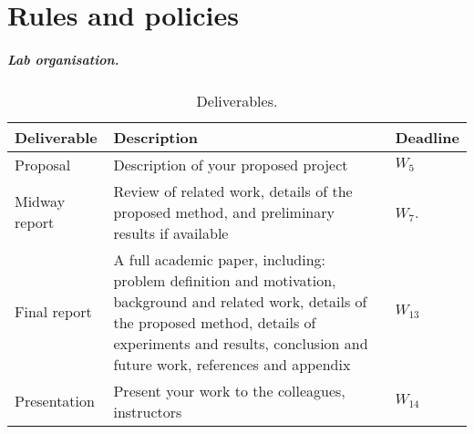 \chapter{Rules and policies}



\paragraph{Lab organisation.} 


\begin{table}
\caption{\label{tab:deliverables}Deliverables.}
\begin{center}
\begin{tabular}{|l|p{7cm}|l|} \hline
Deliverable & Description  & Deadline \\ \hline
Proposal&   Description of your proposed project  & $W_5$\\ \hline
Midway report & Review of related work, details of the proposed method, and preliminary results if available &   $W_7$.\\ \hline
Final report & A full academic paper, including: problem definition and motivation, background and related work, details of the proposed method, details of experiments and results, conclusion and future work, references and appendix &  $W_{13}$\\ \hline
Presentation & Present your work to the colleagues, instructors & $W_{14}$\\ \hline
\end{tabular}
\end{center}
\end{table}


